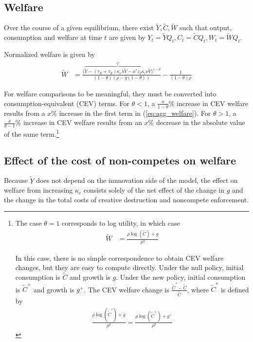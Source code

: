 \documentclass[12pt,english]{article}
\theoremstyle{remark}
\begin{document}
\subsection{Welfare}

Over the course of a given equilibrium, there exist $\tilde{Y},\tilde{C},\tilde{W}$ such that output, consumption and welfare at time $t$ are given by $Y_t = \tilde{Y} Q_t, C_t = \tilde{C} Q_t, W_t = \tilde{W} Q_t$. 

Normalized welfare is given by 
\begin{align}
\tilde{W} &= \frac{\big(\overbrace{\tilde{Y} - (\tau_E + \tau_S) \kappa_{e} \lambda \tilde{V} - x^* z_I \kappa_c \nu \tilde{V}}^{\tilde{C}}\big)^{1-\theta}}{(1-\theta)(\rho - g(1-\theta))} - \frac{1}{(1-\theta)\rho}  \label{eq:agg_welfare}
\end{align}


For welfare comparisons to be meaningful, they must be converted into consumption-equivalent (CEV) terms. For $\theta < 1$, a $\frac{x}{1-\theta}\%$ increase in CEV welfare results from a $x\%$ increase in the first term in (\ref{eq:agg_welfare}). For $\theta > 1$, a $\frac{x}{\theta-1}\%$ increase in CEV welfare results from an $x\%$ decrease in the absolute value of the same term.\footnote{The case $\theta = 1$ corresponds to log utility, in which case
	\begin{align}
	\tilde{W} &= \frac{\rho \log(\tilde{C}) + g}{\rho^2} \label{eq:agg_welfare_log}
	\end{align}
	
	In this case, there is no simple correspondence to obtain CEV welfare changes, but they are easy to compute directly. Under the null policy, initial consumption is $\tilde{C}$ and growth is $g$. Under the new policy, initial consumption is $\tilde{C}^+$ and growth is $g^+$. The CEV welfare change is $\frac{\tilde{C}^* - \tilde{C}}{\tilde{C}}$, where $\tilde{C}^*$ is defined by 
	\begin{align}
	\frac{\rho\log(\tilde{C}^*) + g}{\rho^2} = \frac{\rho \log(\tilde{C}^+) + g^+}{\rho^2} \label{eq:agg_welfare_log_CEV}
	\end{align}}

\subsection{Effect of the cost of non-competes on welfare}

Because $\tilde{Y}$ does not depend on the innnovation side of the model, the effect on welfare from increasing $\kappa_c$ consists solely of the net effect of the change in $g$ and the change in the total costs of creative destruction and noncompete enforcement.
\end{document}
